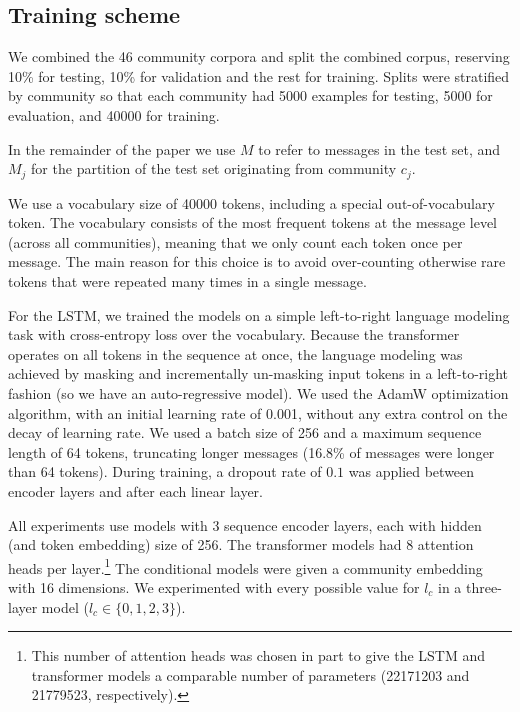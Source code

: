 \documentclass[11pt,a4paper]{article}
\newcommand\jp[1]{\todo[backgroundcolor=blue!10]{JP: #1}}
\begin{document}
\subsection{Training scheme}

We combined the 46 community corpora and split the combined corpus,
reserving 10\% for testing, 10\% for validation and the rest for training.
Splits were stratified by community so that each community had \num{5000} examples
for testing, \num{5000} for evaluation, and \num{40000} for training.

In the remainder of the paper we use $M$ to refer to messages in the
test set, and $M_j$ for the partition of the test set originating from
community $c_j$.

We use a vocabulary size of \num{40000} tokens, including a special
out-of-vocabulary token.  The vocabulary consists of the most frequent
tokens at the message level (across all communities), meaning that we
only count each token once per message.  The main reason for this
choice is to avoid over-counting otherwise rare tokens that were
repeated many times in a single message.

For the LSTM, we trained the models on a simple left-to-right language
modeling task with cross-entropy loss over the vocabulary.  Because
the transformer operates on all tokens in the sequence at once, the
language modeling was achieved by masking and incrementally un-masking
input tokens in a left-to-right fashion (so we have an
auto-regressive\jp{check} model).  We used the AdamW
\citep{Loshchilov2019} optimization algorithm, with an initial
learning rate of \num{0.001}, without any extra control on the decay
of learning rate.
%
We used a batch size of \num{256} and a maximum sequence length of
\num{64} tokens, truncating longer messages (16.8\% of messages were
longer than \num{64} tokens).  During training, a dropout rate of
$0.1$ was applied between encoder layers and after each linear layer.

All experiments use models with \num{3} sequence encoder layers,
each with hidden (and token embedding) size of \num{256}. 
The transformer models had \num{8} attention heads per layer.\footnote{
  This number of attention heads was chosen in part to give the LSTM and transformer
  models a comparable number of parameters 
  (\num{22171203} and \num{21779523}, respectively).}
The conditional models were given a community embedding with \num{16} dimensions. 
We experimented with every possible value for $l_c$ in a three-layer model ($l_c\in\{0,1,2,3\}$).
\end{document}
